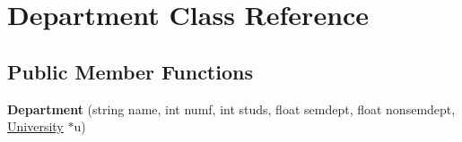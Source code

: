 \hypertarget{classDepartment}{\section{\-Department \-Class \-Reference}
\label{classDepartment}
}
\subsection*{\-Public \-Member \-Functions}
\begin{DoxyCompactItemize}
\item 
\hypertarget{classDepartment_a83ab228c9002c088c7ac0b9800b1479b}{{\bfseries \-Department} (string name, int numf, int studs, float semdept, float nonsemdept, \hyperlink{classUniversity}{\-University} $\ast$u)}\label{classDepartment_a83ab228c9002c088c7ac0b9800b1479b}

\end{DoxyCompactItemize}
